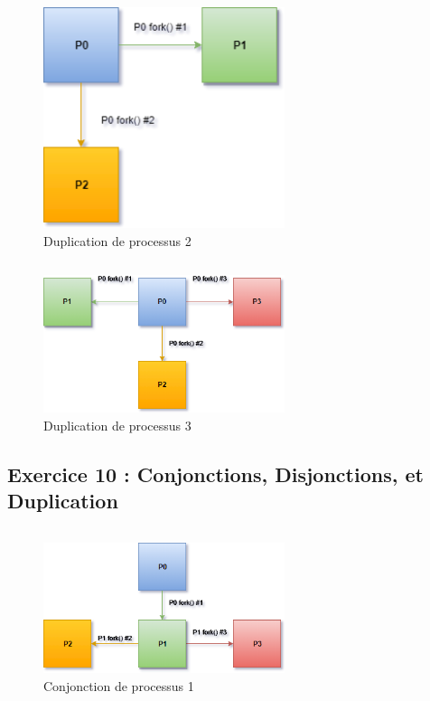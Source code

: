 \inputminted[linenos,firstline=5, lastline=9]{cpp}{../sources/cpp/TP5-6/ex9-programme2.c}
\begin{figure}[H]
\centering
\includegraphics[width=200pt]{./cpp/Pictures/tp5+tp6-ex9-programme2}
\caption{Duplication de processus 2}
\label{Duplication de processus 2}
\end{figure}

\inputminted[linenos,firstline=5, lastline=13]{cpp}{../sources/cpp/TP5-6/ex9-programme3.c}
\begin{figure}[H]
\centering
\includegraphics[width=200pt]{./cpp/Pictures/tp5+tp6-ex9-programme3}
\caption{Duplication de processus 3}
\label{Duplication de processus 3}
\end{figure}

\subsection{Exercice 10 : Conjonctions, Disjonctions, et Duplication}

\inputminted[linenos,firstline=5, lastline=8]{cpp}{../sources/cpp/TP5-6/ex10-conjonction1.c}
\begin{figure}[H]
\centering
\includegraphics[width=200pt]{./cpp/Pictures/tp5+tp6-ex10-conjonction1}
\caption{Conjonction de processus 1}
\label{Conjonction de processus 1}
\end{figure}

